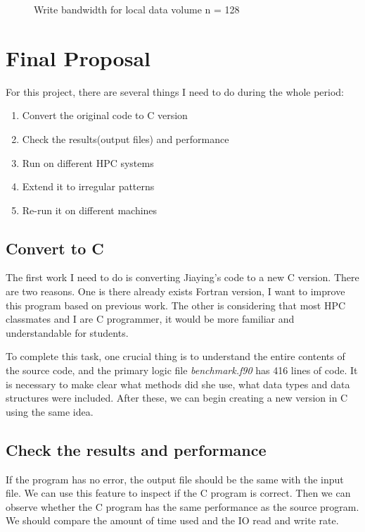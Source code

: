 \documentclass{article}
\begin{document}
\begin{figure}[h]
\begin{center}
\end{center}
\caption{Write bandwidth for local data volume n = 128}
\label{fig:eucrest}
\end{figure}

\section{Final Proposal}
For this project, there are several things I need to do during the whole period:

\begin{enumerate}
    \item Convert the original code to C version
    \item Check the results(output files) and performance
    \item Run on different HPC systems
    \item Extend it to irregular patterns
    \item Re-run it on different machines
\end{enumerate}
\subsection{Convert to C}
The first work I need to do is converting Jiaying's code to a new C version. There are two reasons. One is there already exists Fortran version, I want to improve this program based on previous work. The other is considering that most HPC classmates and I are C programmer, it would be more familiar and understandable for students.

To complete this task, one crucial thing is to understand the entire contents of the source code, and the primary logic file \textit{benchmark.f90} has 416 lines of code. It is necessary to make clear what methods did she use, what data types and data structures were included. After these, we can begin creating a new version in C using the same idea.

\subsection{Check the results and performance}
If the program has no error, the output file should be the same with the input file. We can use this feature to inspect if the C program is correct. Then we can observe whether the C program has the same performance as the source program. We should compare the amount of time used and the IO read and write rate.
\end{document}
